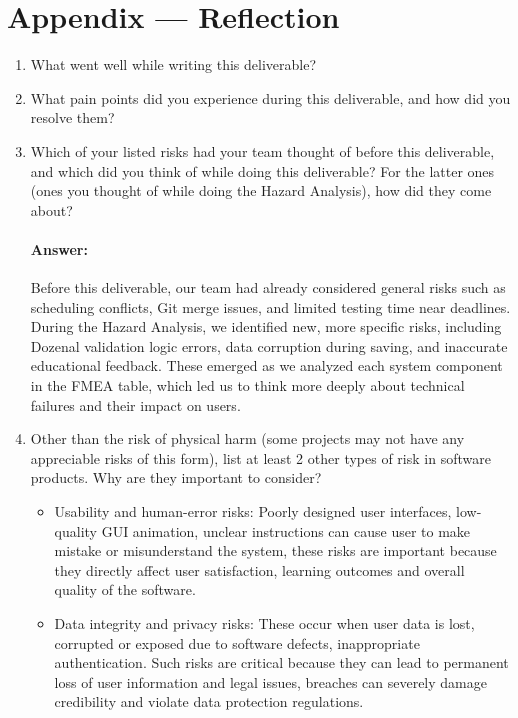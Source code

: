 \documentclass{article}
\begin{document}
\newpage{}

\section*{Appendix --- Reflection}




\begin{enumerate}
    \item What went well while writing this deliverable? 
    \item What pain points did you experience during this deliverable, and how
    did you resolve them?
    \item Which of your listed risks had your team thought of before this
    deliverable, and which did you think of while doing this deliverable? For
    the latter ones (ones you thought of while doing the Hazard Analysis), how
    did they come about?
    \paragraph{Answer:}
    Before this deliverable, our team had already considered general risks such as scheduling conflicts, Git merge issues, and limited testing time near deadlines.
    During the Hazard Analysis, we identified new, more specific risks, including Dozenal validation logic errors, data corruption during saving, and inaccurate educational feedback. These emerged as we analyzed each system component in the FMEA table, which led us to think more deeply about technical failures and their impact on users.
    \item Other than the risk of physical harm (some projects may not have any
    appreciable risks of this form), list at least 2 other types of risk in
    software products. Why are they important to consider? 
	\begin{itemize}
	\item Usability and human-error risks: Poorly designed user interfaces, low-quality GUI animation, unclear instructions can cause user to make mistake or misunderstand the system, these risks are important because they directly affect user satisfaction, learning outcomes and overall quality of the software.
	\item Data integrity and privacy risks: These occur when user data is lost, corrupted or exposed due to software defects, inappropriate authentication. Such risks are critical because they can lead to permanent loss of user information and legal issues, breaches can severely damage credibility and violate data protection regulations.
	
	\end{itemize}
\end{enumerate}
\end{document}
